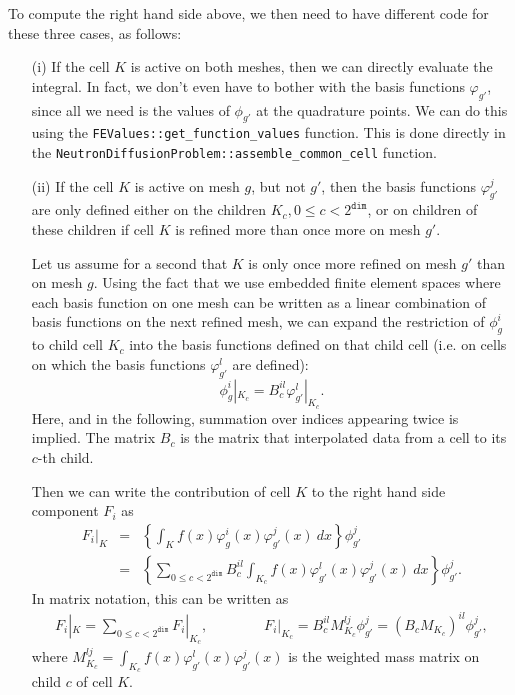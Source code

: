 \documentclass{article}
\begin{document}
To compute the right hand side above, we then need to have different code for
these three cases, as follows:
\begin{itemize}
\item[(i)] If the cell $K$ is active on both meshes, then we can directly
  evaluate the integral. In fact, we don't even have to bother with the basis
  functions $\varphi_{g'}$, since all we need is the values of $\phi_{g'}$ at
  the quadrature points. We can do this using the
  \texttt{FEValues::get\_function\_values} function. This is done directly in
  the \texttt{NeutronDiffusionProblem::assemble\_common\_cell} function.

\item[(ii)] If the cell $K$ is active on mesh $g$, but not $g'$, then the
  basis functions $\varphi_{g'}^j$ are only defined either on the children
  $K_c,0\le c<2^{\texttt{dim}}$, or on children of these children if cell $K$
  is refined more than once more on mesh $g'$.

  Let us assume for a second that $K$ is only once more refined on mesh $g'$
  than on mesh $g$. Using the fact that we use embedded finite element spaces
  where each basis function on one mesh can be written as a linear combination
  of basis functions on the next refined mesh, we can expand the restriction
  of $\phi_g^i$ to child cell $K_c$ into the basis functions defined on that
  child cell (i.e. on cells on which the basis functions $\varphi_{g'}^l$ are
  defined):
  \begin{equation}
    \phi_g^i|_{K_c} = B_c^{il} \varphi_{g'}^l|_{K_c}.
  \end{equation}
  Here, and in the following, summation over indices appearing twice is
  implied. The matrix $B_c$ is the matrix that interpolated data from a cell
  to its $c$-th child.

  Then we can write the contribution of cell $K$ to the right hand side
  component $F_i$ as
  \begin{eqnarray*}
    F_i|_K
    &=&
    \left\{ \int_K f(x) \varphi_g^i(x) \varphi_{g'}^j(x) 
    \ dx \right\} \phi_{g'}^j 
    \\
    &=&
    \left\{
    \sum_{0\le c<2^{\texttt{dim}}}
    B_c^{il} \int_{K_c} f(x) \varphi_{g'}^l(x) \varphi_{g'}^j(x) 
    \ dx \right\} \phi_{g'}^j.
  \end{eqnarray*}
  In matrix notation, this can be written as
  \begin{eqnarray*}
    F_i|_K
    =
    \sum_{0\le c<2^{\texttt{dim}}}
    F_i|_{K_c},
    \qquad
    \qquad
    F_i|_{K_c} = B_c^{il} M_{K_c}^{lj}  \phi_{g'}^j
    = (B_c M_{K_c})^{il} \phi_{g'}^j,
  \end{eqnarray*}
  where $M_{K_c}^{lj}=\int_{K_c} f(x) \varphi_{g'}^l(x) \varphi_{g'}^j(x)$ is
  the weighted mass matrix on child $c$ of cell $K$.
  

\end{itemize}
\end{document}
